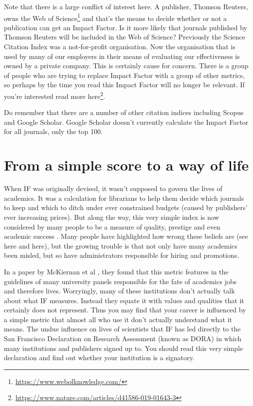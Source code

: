\documentclass[
]{krantz}
\renewcommand{\href}[2]{#2\footnote{\url{#1}}}
\begin{document}
Note that there is a large conflict of interest here. A publisher, Thomson Reuters, owns the \href{https://www.webofknowledge.com/}{Web of Science} and that's the means to decide whether or not a publication can get an Impact Factor. Is it more likely that journals published by Thomson Reuters will be included in the Web of Science? Previously the Science Citation Index was a not-for-profit organisation. Now the organisation that is used by many of our employers in their means of evaluating our effectiveness is owned by a private company. This is certainly cause for concern. There is a group of people who are trying to replace Impact Factor with a group of other metrics, so perhaps by the time you read this Impact Factor will no longer be relevant. If you're interested read more \href{https://www.nature.com/articles/d41586-019-01643-3}{here}.

Do remember that there are a number of other citation indices including Scopus and Google Scholar. Google Scholar doesn't currently calculate the Impact Factor for all journals, only the top 100.

\hypertarget{from-a-simple-score-to-a-way-of-life}{%
\section{From a simple score to a way of life}\label{from-a-simple-score-to-a-way-of-life}}

When IF was originally devised, it wasn't supposed to govern the lives of academics. It was a calculation for librarians to help them decide which journals to keep and which to ditch under ever constrained budgets (caused by publishers' ever increasing prices). But along the way, this very simple index is now considered by many people to be a measure of quality, prestige and even academic success \citep{garfield1999journal}. Many people have highlighted how wrong these beliefs are (see here and here), but the growing trouble is that not only have many academics been misled, but so have administrators responsible for hiring and promotions.

In a paper by McKiernan et al \citeyearpar{mckiernan2019use}, they found that this metric features in the guidelines of many university panels responsible for the fate of academics jobs and therefore lives. Worryingly, many of these institutions don't actually talk about what IF measures. Instead they equate it with values and qualities that it certainly does not represent. Thus you may find that your career is influenced by a simple metric that almost all who use it don't actually understand what it means. The undue influence on lives of scientists that IF has led directly to the San Francisco Declaration on Research Assessment (known as DORA) in which many institutions and publishers signed up to. You should read this very simple declaration and find out whether your institution is a signatory.
\end{document}
